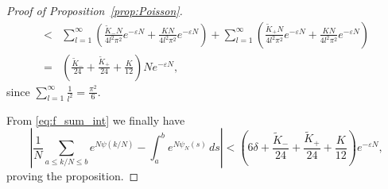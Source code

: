 \documentclass[a4paper,dvipdfmx]{amsart}
\theoremstyle{plain}
\theoremstyle{definition}
\theoremstyle{remark}
\numberwithin{equation}{section}
\begin{document}
\begin{proof}[Proof of Proposition~\ref{prop:Poisson}]
\begin{align*}
  <&
  \sum_{l=1}^{\infty}
  \left(
    \frac{\tilde{K}_{-}N}{4l^2\pi^2}e^{-\varepsilon N}
    +
    \frac{KN}{4l^2\pi^2}e^{-\varepsilon N}
  \right)
  +
  \sum_{l=1}^{\infty}
  \left(
    \frac{\tilde{K}_{+}N}{4l^2\pi^2}e^{-\varepsilon N}
    +
    \frac{KN}{4l^2\pi^2}e^{-\varepsilon N}
  \right)
  \\
  =&
  \left(
    \frac{\tilde{K}_{-}}{24}
    +
    \frac{\tilde{K}_{+}}{24}
    +
    \frac{K}{12}
  \right)
  Ne^{-\varepsilon N},
\end{align*}
since $\sum_{l=1}^{\infty}\frac{1}{l^2}=\frac{\pi^2}{6}$.
\par
From \eqref{eq:f_sum_int} we finally have
\begin{equation*}
  \left|
    \frac{1}{N}\sum_{a\le k/N\le b}e^{N\psi(k/N)}
    -
    \int_{a}^{b}e^{N\psi_N(s)}\,ds
  \right|
  <
  \left(
    6\delta
    +
    \frac{\tilde{K}_{-}}{24}
    +
    \frac{\tilde{K}_{+}}{24}
    +
    \frac{K}{12}
  \right)
  e^{-\varepsilon N},
\end{equation*}
proving the proposition.
\end{proof}
\end{document}
